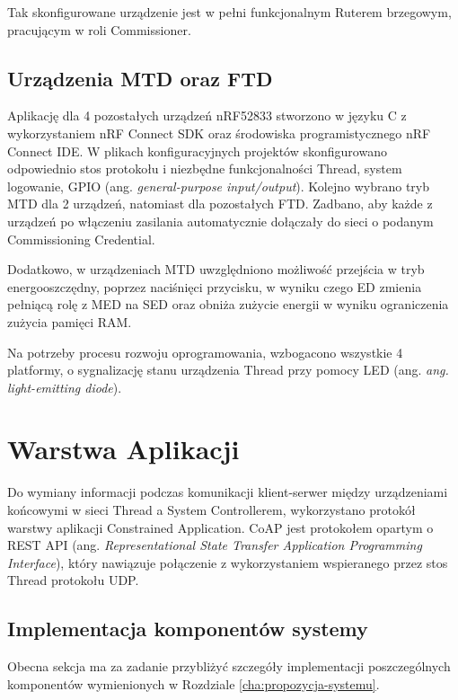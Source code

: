         Tak skonfigurowane urządzenie jest w pełni funkcjonalnym Ruterem brzegowym, pracującym w roli Commissioner.

    \subsection{Urządzenia MTD oraz FTD}
    \label{subsubsec:mtd-ftd-devices-implementation}

    Aplikację dla 4 pozostałych urządzeń nRF52833 stworzono w języku C z wykorzystaniem nRF Connect SDK oraz środowiska programistycznego nRF Connect IDE. W plikach konfiguracyjnych projektów skonfigurowano odpowiednio stos protokołu i niezbędne funkcjonalności Thread, system logowanie, GPIO (ang. \textit{general-purpose input/output}). Kolejno wybrano tryb MTD dla 2 urządzeń, natomiast dla pozostałych FTD. Zadbano, aby każde z urządzeń po włączeniu zasilania automatycznie dołączały do sieci o podanym Commissioning Credential. 

    Dodatkowo, w urządzeniach MTD uwzględniono możliwość przejścia w tryb energooszczędny, poprzez naciśnięci przycisku, w wyniku czego ED zmienia pełniącą rolę z MED na SED oraz obniża zużycie energii w wyniku ograniczenia zużycia pamięci RAM.

    Na potrzeby procesu rozwoju oprogramowania, wzbogacono wszystkie 4 platformy, o sygnalizację stanu urządzenia Thread przy pomocy LED (ang. \textit{ang. light-emitting diode}).
    
\section{Warstwa Aplikacji}

    Do wymiany informacji podczas komunikacji klient-serwer między urządzeniami końcowymi w sieci Thread a System Controllerem, wykorzystano protokół warstwy aplikacji Constrained Application. CoAP jest protokołem opartym o REST API (ang. \textit{Representational State Transfer Application Programming Interface}), który nawiązuje połączenie z wykorzystaniem wspieranego przez stos Thread protokołu UDP.

    \subsection{Implementacja komponentów systemy}

        Obecna sekcja ma za zadanie przybliżyć szczegóły implementacji poszczególnych komponentów wymienionych w Rozdziale \ref{cha:propozycja-systemu}.

